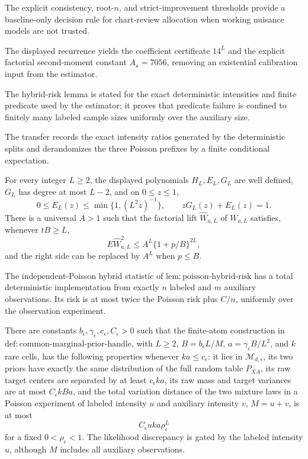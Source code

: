 The explicit consistency, root-\(n\), and strict-improvement thresholds provide a baseline-only decision rule for chart-review allocation when working nuisance models are not trusted.

The displayed recurrence yields the coefficient certificate \(14^L\) and the explicit factorial second-moment constant \(A_\star=7056\), removing an existential calibration input from the estimator.

The hybrid-risk lemma is stated for the exact deterministic intensities and finite predicate used by the estimator; it proves that predicate failure is confined to finitely many labeled sample sizes uniformly over the auxiliary size.

The transfer records the exact intensity ratios generated by the deterministic splits and derandomizes the three Poisson prefixes by a finite conditional expectation.

For every integer \(L\ge2\), the displayed polynomials \(H_L,E_L,G_L\) are well defined, \(G_L\) has degree at most \(L-2\), and on \(0\le z\le1\),
\[
 0\le E_L(z)\le\min\{1,(L^2z)^{-1}\},\qquad zG_L(z)+E_L(z)=1.
\]
There is a universal \(A>1\) such that the factorial lift \(\widehat W_{a,L}\) of \(W_{a,L}\) satisfies, whenever \(tB\ge L\),
\[
 E\widehat W_{a,L}^{2}\le A^L\{1+p/B\}^{2L},
\]
and the right side can be replaced by \(A^L\) when \(p\le B\).

The independent-Poisson hybrid statistic of \(\mathrm{lem:poisson\mbox{-}hybrid\mbox{-}risk}\) has a total deterministic implementation from exactly \(n\) labeled and \(m\) auxiliary observations.  Its risk is at most twice the Poisson risk plus \(C/n\), uniformly over the observation experiment.

There are constants \(b_\epsilon,\gamma_\epsilon,c_\epsilon,C_\epsilon>0\) such that the finite-atom construction in \(\mathrm{def:common\mbox{-}marginal\mbox{-}prior\mbox{-}handle}\), with \(L\ge2\), \(B=b_\epsilon L/M\), \(a=\gamma_\epsilon B/L^2\), and \(k\) rare cells, has the following properties whenever \(ka\le c_\epsilon\): it lies in \(\mathcal M_{d,\epsilon}\), its two priors have exactly the same distribution of the full random table \(P_{XA}\), its raw target centers are separated by at least \(c_\epsilon ka\), its raw mass and target variances are at most \(C_\epsilon kBa\), and the total variation distance of the two mixture laws in a Poisson experiment of labeled intensity \(u\) and auxiliary intensity \(v\), \(M=u+v\), is at most
\[
 C_\epsilon uka\rho_\epsilon^L
\]
for a fixed \(0<\rho_\epsilon<1\).  The likelihood discrepancy is gated by the labeled intensity \(u\), although \(M\) includes all auxiliary observations.

